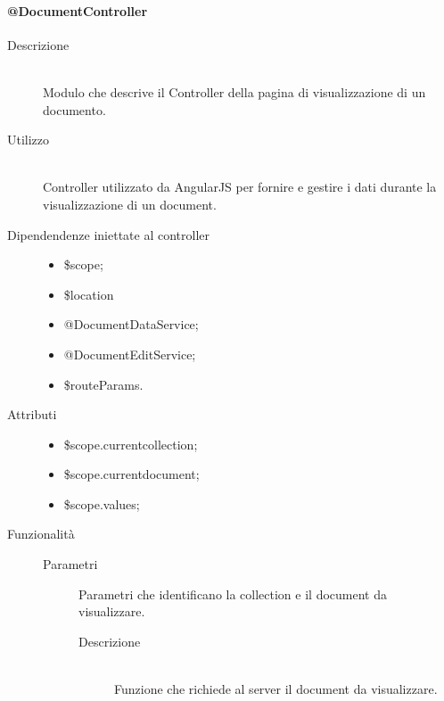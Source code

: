 \paragraph{@DocumentController}
\begin{description}
 \item[Descrizione] \hfill \\
 Modulo che descrive il Controller della pagina di visualizzazione di un documento.
 
 \item[Utilizzo] \hfill \\
 Controller utilizzato da AngularJS per fornire e gestire i dati durante la visualizzazione di un document.
 
 \item[Dipendendenze iniettate al controller] \hfill
 \begin{itemize}
  \item \$scope;
  \item \$location
  \item @DocumentDataService;
  \item @DocumentEditService;
  \item \$routeParams.
 \end{itemize}
 
 
 \item[Attributi] \hfill
 \begin{itemize}
 \item  \$scope.current\textunderscore collection;
 \item  \$scope.current\textunderscore document;
 \item  \$scope.values;
 \end{itemize}
 
 \item[Funzionalità]
 \begin{mldescription}
  \begin{description}
  	\item[Parametri]
  		\begin{mldescription}
        
        Parametri che identificano la collection e il document da visualizzare.
  		\end{mldescription}
  	\begin{description}
  	\item[Descrizione] \hfill \\
	Funzione che richiede al server il document da visualizzare.
	\end{description}
  \end{description}


\end{mldescription}
\end{description}
